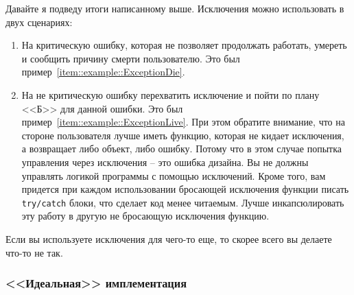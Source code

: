 Давайте я подведу итоги написанному выше.
Исключения можно использовать в двух сценариях:
\begin{enumerate}
\item На критическую ошибку, которая не позволяет продолжать работать, умереть и сообщить причину смерти пользователю.
Это был пример~\ref{item::example::ExceptionDie}.

\item На не критическую ошибку перехватить исключение и пойти по плану <<Б>> для данной ошибки.
Это был пример~\ref{item::example::ExceptionLive}.
При этом обратите внимание, что на стороне пользователя лучше иметь функцию, которая не кидает исключения, а возвращает либо объект, либо ошибку.
Потому что в этом случае попытка управления через исключения -- это ошибка дизайна.
Вы не должны управлять логикой программы с помощью исключений.
Кроме того, вам придется при каждом использовании бросающей исключения функции писать \verb"try/catch" блоки, что сделает код менее читаемым.
Лучше инкапсюлировать эту работу в другую не бросающую исключения функцию.
\end{enumerate}
Если вы используете исключения для чего-то еще, то скорее всего вы делаете что-то не так.

\subsubsection{<<Идеальная>> имплементация}
\label{section::IdealException}

